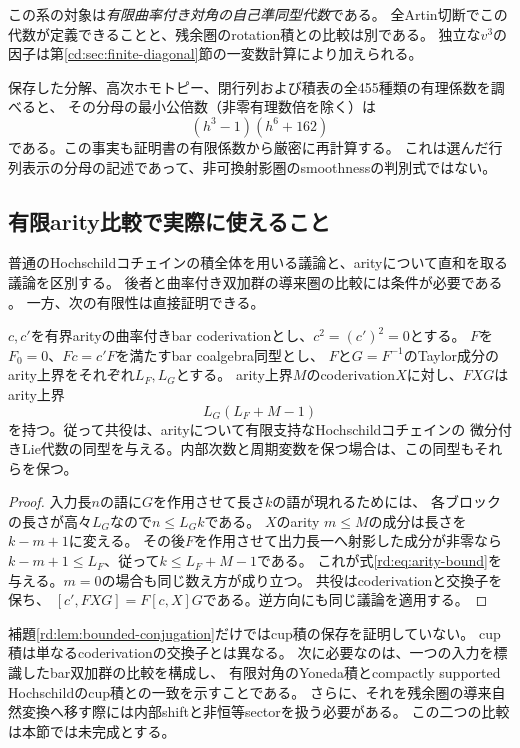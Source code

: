 この系の対象は\emph{有限曲率付き対角の自己準同型代数}である。
全Artin切断でこの代数が定義できることと、残余圏のrotation積との比較は別である。
独立な$v^3$の因子は第\ref{cd:sec:finite-diagonal}節の一変数計算により加えられる。

保存した分解、高次ホモトピー、閉行列および積表の全455種類の有理係数を調べると、
その分母の最小公倍数（非零有理数倍を除く）は
\[
 (h^3-1)(h^6+162)
\]
である。この事実も証明書の有限係数から厳密に再計算する。
これは選んだ行列表示の分母の記述であって、非可換射影圏のsmoothnessの判別式ではない。


\subsection{有限arity比較で実際に使えること}
普通のHochschildコチェインの積全体を用いる議論と、arityについて直和を取る議論を区別する。
後者と曲率付き双加群の導来圏の比較には条件が必要である
\cite[\S3.3, \S3.5]{RDPP}\cite[Theorem~6.14, Remark~6.16]{CDGHLR}。
一方、次の有限性は直接証明できる。

\begin{lemma}[有界arity同型による共役]\label{rd:lem:bounded-conjugation}
$c,c'$を有界arityの曲率付きbar coderivationとし、$c^2=(c')^2=0$とする。
$F$を$F_0=0$、$Fc=c'F$を満たすbar coalgebra同型とし、
$F$と$G=F^{-1}$のTaylor成分のarity上界をそれぞれ$L_F,L_G$とする。
arity上界$M$のcoderivation$X$に対し、$FXG$はarity上界
\[
 L_G(L_F+M-1)
 \tag{RD3}\label{rd:eq:arity-bound}
\]
を持つ。従って共役は、arityについて有限支持なHochschildコチェインの
微分付きLie代数の同型を与える。内部次数と周期変数を保つ場合は、この同型もそれらを保つ。
\end{lemma}
\begin{proof}
入力長$n$の語に$G$を作用させて長さ$k$の語が現れるためには、
各ブロックの長さが高々$L_G$なので$n\le L_Gk$である。
$X$のarity $m\le M$の成分は長さを$k-m+1$に変える。
その後$F$を作用させて出力長一へ射影した成分が非零なら
$k-m+1\le L_F$、従って$k\le L_F+M-1$である。
これが式\eqref{rd:eq:arity-bound}を与える。$m=0$の場合も同じ数え方が成り立つ。
共役はcoderivationと交換子を保ち、
$[c',FXG]=F[c,X]G$である。逆方向にも同じ議論を適用する。
\end{proof}

\begin{remark}[Lie比較から積比較を飛躍させない]
補題\ref{rd:lem:bounded-conjugation}だけではcup積の保存を証明していない。
cup積は単なるcoderivationの交換子とは異なる。
次に必要なのは、一つの入力を標識したbar双加群の比較を構成し、
有限対角のYoneda積とcompactly supported Hochschildのcup積との一致を示すことである。
さらに、それを残余圏の導来自然変換へ移す際には内部shiftと非恒等sectorを扱う必要がある。
この二つの比較は本節では未完成とする。
\end{remark}

